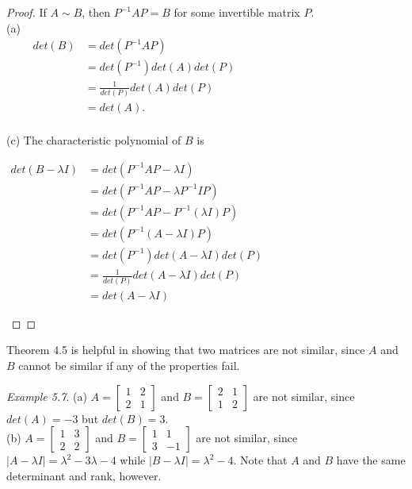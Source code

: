 \documentclass[
  letterpaper,
  DIV=11,
  numbers=noendperiod]{scrartcl}
\theoremstyle{remark}
\begin{document}
\begin{proof}
If \(A \sim B\), then \(P^{-1}AP = B\) for some invertible matrix
\(P\).\\
(a)\\
\(\begin{alignedat}{2}
            \qquad det(B) &= det(P^{-1}AP) \\
            {} &= det(P^{-1})det(A)det(P) \\
            {} &= \frac{1}{det(P)}det(A)det(P) \\
            {} &= det(A). \\
        \end{alignedat}\)

(c) The characteristic polynomial of \(B\) is

\(\begin{alignedat}{2}
            det(B - \lambda I) &= det(P^{-1}AP - \lambda I) \\
            {} &= det(P^{-1}AP - \lambda P^{-1}IP) \\
            {} &= det(P^{-1}AP - P^{-1}(\lambda I)P) \\
            {} &= det(P^{-1}(A - \lambda I)P) \\
            {} &= det(P^{-1})det(A - \lambda I)det(P) \\
            {} &= \frac{1}{det(P)}det(A - \lambda I)det(P) \\
            {} &= det(A - \lambda I)
        \end{alignedat}\)

~◻
\end{proof}

Theorem 4.5 is helpful in showing that two matrices are not similar,
since \(A\) and \(B\) cannot be similar if any of the properties fail.

\emph{Example 5.7}. (a)
\(A = \left[\begin{array}{cc} 1 & 2 \\ 2 & 1 \end{array}\right]\) and
\(B = \left[\begin{array}{cc} 2 & 1 \\ 1 & 2 \end{array}\right]\) are
not similar, since \(det(A) = -3\) but \(det(B) = 3\).\\
(b) \(A = \left[\begin{array}{cc} 1 & 3 \\ 2 & 2 \end{array}\right]\)
and \(B = \left[\begin{array}{cc} 1 & 1 \\ 3 & -1 \end{array}\right]\)
are not similar, since \(|A - \lambda I| = \lambda ^{2} - 3\lambda - 4\)
while \(|B - \lambda I| = \lambda ^{2} - 4\). Note that \(A\) and \(B\)
have the same determinant and rank, however.
\end{document}
